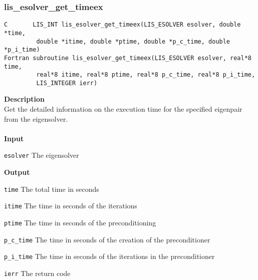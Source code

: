 \documentclass[a4paper]{article}
\newcommand{\namelistlabel}[1]{\mbox{#1}\hfill}
\newenvironment{namelist}[1]{%
\begin{list}{}
  {\let\makelabel\namelistlabel
  \settowidth{\labelwidth}{#1}
  \setlength{\leftmargin}{1.1\labelwidth}}
  }{%
\end{list}}
\begin{document}
\newpage
\subsubsection{lis\_esolver\_get\_timeex}
\begin{screen}
\verb|C       LIS_INT lis_esolver_get_timeex(LIS_ESOLVER esolver, double *time,|\\
\verb|         double *itime, double *ptime, double *p_c_time, double *p_i_time)|\\
\verb|Fortran subroutine lis_esolver_get_timeex(LIS_ESOLVER esolver, real*8 time,|\\
\verb|         real*8 itime, real*8 ptime, real*8 p_c_time, real*8 p_i_time,|\\
\verb|         LIS_INTEGER ierr)|
\end{screen}
{\bf Description}\\
\indent
Get the detailed information on the execution time for the specified eigenpair from the eigensolver.
\\ \\
\noindent
{\bf Input}
\begin{namelist}{XXXXXXXXXXXXXXXXXXXX}
\item[\tt esolver] The eigensolver
\end{namelist}
{\bf Output}
\begin{namelist}{XXXXXXXXXXXXXXXXXXXX}
\item[\tt time] The total time in seconds
\item[\tt itime] The time in seconds of the iterations
\item[\tt ptime] The time in seconds of the preconditioning
\item[\tt p\_c\_time] The time in seconds of the creation of the preconditioner
\item[\tt p\_i\_time] The time in seconds of the iterations in the preconditioner
\item[\tt ierr] The return code
\end{namelist}
\end{document}

